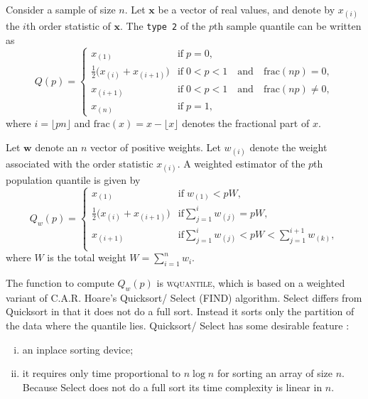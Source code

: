 \documentclass[a4paper,oneside,11pt,DIV=12]{scrartcl}
\newcommand{\code}[1]{{\texttt{#1}}}
\begin{document}
Consider a sample of size $n$. Let $\bm x$ be a vector of real values, and denote by $x_{(i)}$ the $i$th order statistic of $\bm x$. The \code{type 2} of the $p$th sample quantile can be written as 
\begin{equation}
	Q(p) = \begin{cases}
		x_{(1)} & \text{if} \; p = 0, \\
		\frac{1}{2}\big(x_{(i)} + x_{(i+1)}\big) & \text{if} \; 0 < p < 1 \quad \text{and} \quad \mathrm{frac}(np) = 0, \\
 		x_{(i+1)} & \text{if} \; 0 < p < 1 \quad \text{and} \quad \mathrm{frac}(np) \neq 0, \\
		x_{(n)} & \text{if} \; p = 1,
	\end{cases}
\end{equation}
\noindent where $i=\lfloor pn\rfloor$ and $\mathrm{frac}(x) = x - \lfloor x \rfloor$ denotes the fractional part of $x$.

Let $\bm w$ denote an $n$ vector of positive weights. Let $w_{(i)}$ denote the weight associated with the order statistic $x_{(i)}$. A weighted estimator of the $p$th population quantile is given by 
\begin{equation}
	Q_w(p) = \begin{cases}
		x_{(1)} & \text{if} \; w_{(1)} < p W, \\
		\frac{1}{2}\big(x_{(i)} + x_{(i+1)}\big) & \text{if} \sum_{j=1}^i w_{(j)} = p W, \\ 
		x_{(i+1)} & \text{if} \sum_{j=1}^i w_{(j)} < p W < \sum_{j=1}^{i+1} w_{(k)}, \\
	\end{cases}
\end{equation}
\noindent where $W$ is the total weight $W = \sum_{i=1}^n w_i$. 

The function to compute $Q_w(p)$ is \textsc{wquantile}, which is based on a weighted variant of C.A.R. Hoare's Quicksort/ Select (FIND) algorithm. Select differs from Quicksort in that it does not do a full sort. Instead it sorts only the partition of the data where the quantile lies. Quicksort/ Select has some desirable feature \citep[][p. 303]{sedgewick_1997}:
\begin{enumerate}[i)]
	\item an inplace sorting device; 
	\item it requires only time proportional to $n \log n$ for sorting an array of size $n$. Because Select does not do a full sort its time complexity is linear in $n$. 
\end{enumerate}
\end{document}
